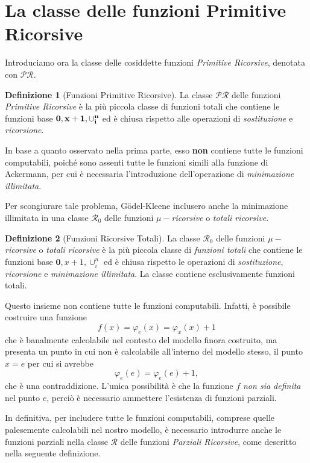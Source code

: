 \documentclass[10pt]{\classname}
\theoremstyle{definition}
\newtheorem{definizione}{Definizione}[section]
\theoremstyle{definition}
\begin{document}
\section{La classe delle funzioni Primitive Ricorsive}

Introduciamo ora la classe delle cosiddette funzioni \emph{Primitive Ricorsive}, denotata con $\mathcal {PR}.$

\begin{definizione}[Funzioni Primitive Ricorsive]
    La classe $\mathcal {PR}$ delle funzioni \emph{Primitive Ricorsive} è la più piccola classe di funzioni totali che contiene le funzioni base $\bf{0}, x+1, \cup_i^n$ ed è chiusa rispetto alle operazioni di \emph{sostituzione} e \emph{ricorsione}.
\end{definizione}

In base a quanto osservato nella prima parte, esso \textbf{non} contiene tutte le funzioni computabili, poiché sono assenti tutte le funzioni simili alla funzione di Ackermann, per cui è necessaria l'introduzione dell'operazione di \emph{minimazione illimitata}.

Per scongiurare tale problema, Gödel-Kleene inclusero anche la minimazione illimitata in una classe $\mathcal R_0$ delle funzioni $\mu-$\emph{ricorsive} o \emph{totali ricorsive}.

\begin{definizione}[Funzioni Ricorsive Totali]
    La classe $\mathcal R_0$ delle funzioni $\mu-$\emph{ricorsive} o \emph{totali ricorsive} è la più piccola classe di \emph{funzioni totali} che contiene le funzioni base $\bm{0}, x+1, \cup_i^n$ ed è chiusa rispetto le operazioni di \emph{sostituzione}, \emph{ricorsione} e \emph{minimazione illimitata}. La classe contiene esclusivamente funzioni totali.
\end{definizione}

Questo insieme non contiene tutte le funzioni computabili. Infatti, è possibile costruire una funzione \[f(x) = \varphi_e(x) = \varphi_x(x) + 1\] che è banalmente calcolabile nel contesto del modello finora costruito, ma presenta un punto in cui non è calcolabile all'interno del modello stesso, il punto $x=e$ per cui si avrebbe
\[\varphi_e(e) = \varphi_e(e) + 1,\] che è una contraddizione. L'unica possibilità è che la funzione $f$ \emph{non sia definita} nel punto $e$, perciò è necessario ammettere l'esistenza di funzioni parziali.

In definitiva, per includere tutte le funzioni computabili, comprese quelle palesemente calcolabili nel nostro modello, è necessario introdurre anche le funzioni parziali nella classe $\mathcal {R}$ delle funzioni \emph{Parziali Ricorsive}, come descritto nella seguente definizione.
\end{document}
